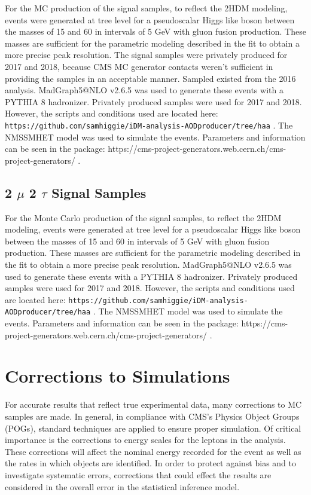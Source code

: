 For the MC production of the signal samples, to reflect the 2HDM modeling, events were generated at tree level for a pseudoscalar Higgs like boson between the masses of 15 and 60 in intervals of 5 GeV with gluon fusion production. These masses are sufficient for the parametric modeling described in the fit to obtain a more precise peak resolution. The signal samples were privately produced for 2017 and 2018, because CMS MC generator contacts weren't sufficient in providing the samples in an acceptable manner. Sampled existed from the 2016 analysis. 
MadGraph5@NLO v2.6.5 was used to generate these events with a PYTHIA 8 hadronizer. Privately produced samples were used for 2017 and 2018. However, the scripts and conditions used are located here:
 \texttt{https://github.com/samhiggie/iDM-analysis-AODproducer/tree/haa} .
The NMSSMHET model was used to simulate the events. Parameters and information can be seen in the package:
https://cms-project-generators.web.cern.ch/cms-project-generators/ .



\subsection{2 $\mu$ 2 $\tau$ Signal Samples }
For the Monte Carlo production of the signal samples, to reflect the 2HDM modeling, events were generated at tree level for a pseudoscalar Higgs like boson between the masses of 15 and 60 in intervals of 5 GeV with gluon fusion production. These masses are sufficient for the parametric modeling described in the fit to obtain a more precise peak resolution.
MadGraph5@NLO v2.6.5 was used to generate these events with a PYTHIA 8 hadronizer. Privately produced samples were used for 2017 and 2018. However, the scripts and conditions used are located here:
 \texttt{https://github.com/samhiggie/iDM-analysis-AODproducer/tree/haa} .
The NMSSMHET model was used to simulate the events. Parameters and information can be seen in the package:
https://cms-project-generators.web.cern.ch/cms-project-generators/ .
 


\section{Corrections to Simulations }

For accurate results that reflect true experimental data, many corrections to MC samples are made. In general, in compliance with CMS's Physics Object Groups (POGs), standard techniques are applied to ensure proper simulation. Of critical importance is the corrections to energy scales for the leptons in the analysis. These corrections will affect the nominal energy recorded for the event as well as the rates in which objects are identified.  In order to protect against bias and to investigate systematic errors, corrections that could effect the results are considered in the overall error in the statistical inference model.

